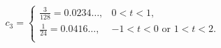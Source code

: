 \[c_{3}=\begin{cases}\tfrac{3}{128}=0.0234\ldots,&0<t<1,\\
\tfrac{1}{24}=0.0416\ldots,&-1<t<0\mbox{ or }1<t<2.\\
\end{cases}\]